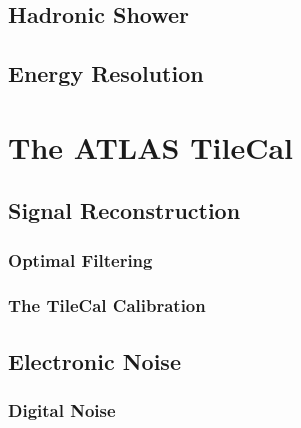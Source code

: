 \documentclass[10pt,twoside,cucitura,classica,english,openany]{toptesi}
\begin{document}
\subsection{Hadronic Shower}
\label{sec:hadronic-shower}



\subsection{Energy Resolution}
\label{sec:energy-resolution}



\section{The ATLAS TileCal}
\label{sec:atlas-tilecal}



\subsection{Signal Reconstruction}
\label{sec:sign-reconstr}



\subsubsection{Optimal Filtering}
\label{sec:optimal-filtering}



\subsubsection{The TileCal Calibration}
\label{sec:tilecal-calibration}



\subsection{Electronic Noise}
\label{sec:electronic-noise}



\subsubsection{Digital Noise}
\label{sec:digital-noise}


\end{document}
